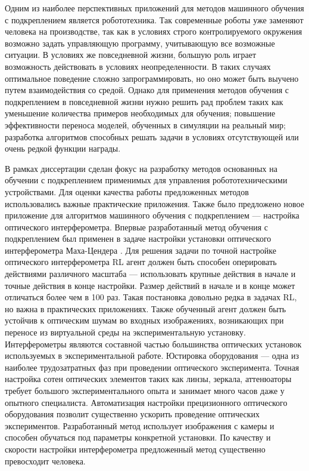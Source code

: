 {\actuality} Одним из наиболее перспективных приложений для методов машинного обучения с подкреплением является робототехника. Так современные роботы уже заменяют человека на производстве, так как в условиях строго контролируемого окружения возможно задать управляющую программу, учитывающую все возможные ситуации. В условиях же повседневной жизни, большую роль играет возможность действовать в условиях неопределенности. В таких случаях оптимальное поведение сложно запрограммировать, но оно может быть выучено путем взаимодействия со средой. Однако для применения методов обучения с подкреплением в повседневной жизни нужно решить рад проблем таких как уменьшение количества примеров необходимых для обучения; повышение эффективности переноса моделей, обученных в симуляции на реальный мир; разработка алгоритмов способных решать задачи в условиях отсутствующей или очень редкой функции награды. 

В рамках диссертации сделан фокус на разработку методов основанных на обучении с подкреплением применимых для управления робототехническими устройствами. Для оценки качества работы предложенных методов использовались важные практические приложения. Также было предложено новое приложение для алгоритмов машинного обучения с подкреплением --- настройка оптического интерферометра. Впервые разработанный метод обучения с подкреплением был применен в задаче настройки установки оптического интерферометра Маха-Цендера \cite{interferobot, v2}. Для решения задачи по точной настройке оптического интерферометра RL агент должен быть способен оперировать действиями различного масштаба --- использовать крупные действия в начале и точные действия в конце настройки. Размер действий в начале и в конце может отличаться более чем в 100 раз. Такая постановка довольно редка в задачах RL, но важна в практических приложениях. Также обученный агент должен быть устойчив к оптическим шумам во входных изображениях, возникающих при переносе из виртуальной среды на экспериментальную установку. Интерферометры являются составной частью большинства оптических установок используемых в экспериментальной работе. Юстировка оборудования --- одна из наиболее трудозатратных фаз при проведении оптического эксперимента. Точная настройка сотен оптических элементов таких как линзы, зеркала, аттенюаторы требует большого экспериментального опыта и занимает много часов даже у опытного специалиста. Автоматизация настройки прецизионного оптического оборудования позволит существенно ускорить проведение оптических экспериментов. Разработанный метод использует изображения с камеры и способен обучаться под параметры конкретной установки. По качеству и скорости настройки интерферометра предложенный метод существенно превосходит человека. 


